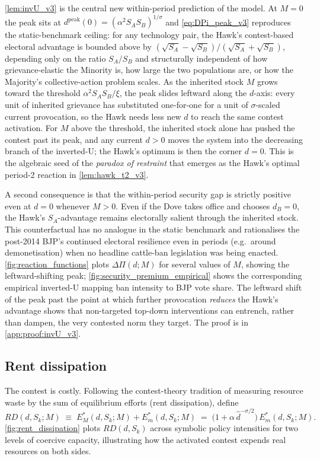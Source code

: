 \documentclass[11pt,twoside]{extarticle}
\begin{document}
\autoref{lem:invU_v3} is the central new within-period prediction of the model. At $M=0$ the peak sits at $d^{\mathrm{peak}}(0)=(\alpha^2 S_A S_B)^{1/\sigma}$ and \autoref{eq:DPi_peak_v3} reproduces the static-benchmark ceiling: for any technology pair, the Hawk's contest-based electoral advantage is bounded above by $(\sqrt{S_A}-\sqrt{S_B})/(\sqrt{S_A}+\sqrt{S_B})$, depending only on the ratio $S_A/S_B$ and structurally independent of how grievance-elastic the Minority is, how large the two populations are, or how the Majority's collective-action problem scales. As the inherited stock $M$ grows toward the threshold $\alpha^2 S_A S_B/\xi$, the peak slides leftward along the $d$-axis: every unit of inherited grievance has substituted one-for-one for a unit of $\sigma$-scaled current provocation, so the Hawk needs less new $d$ to reach the same contest activation. For $M$ above the threshold, the inherited stock alone has pushed the contest past its peak, and any current $d>0$ moves the system into the decreasing branch of the inverted-U; the Hawk's optimum is then the corner $d=0$. This is the algebraic seed of the \emph{paradox of restraint} that emerges as the Hawk's optimal period-2 reaction in \autoref{lem:hawk_t2_v3}.

A second consequence is that the within-period security gap is strictly positive even at $d=0$ whenever $M>0$. Even if the Dove takes office and chooses $d_B=0$, the Hawk's $S_A$-advantage remains electorally salient through the inherited stock. This counterfactual has no analogue in the static benchmark and rationalises the post-2014 BJP's continued electoral resilience even in periods (e.g.\ around demonetisation) when no headline cattle-ban legislation was being enacted. \autoref{fig:reaction_functions} plots $\Delta\Pi(d;M)$ for several values of $M$, showing the leftward-shifting peak; \autoref{fig:security_premium_empirical} shows the corresponding empirical inverted-U mapping ban intensity to BJP vote share. The leftward shift of the peak past the point at which further provocation \emph{reduces} the Hawk's advantage shows that non-targeted top-down interventions can entrench, rather than dampen, the very contested norm they target. The proof is in \autoref{app:proof:invU_v3}.

\subsection{Rent dissipation}\label{subsec:RD_v3}

The contest is costly. Following the contest-theory tradition of measuring resource waste by the sum of equilibrium efforts (rent dissipation), define
\begin{equation}\label{eq:RD_v3}
    RD(d,S_k;M)\;\equiv\;E_M^*(d,S_k;M)+E_m^*(d,S_k;M)\;=\;\big(1+\alpha\,\hat d^{-\sigma/2}\big)\,E_m^*(d,S_k;M).
\end{equation}
\autoref{fig:rent_dissipation} plots $RD(d,S_k)$ across symbolic policy intensities for two levels of coercive capacity, illustrating how the activated contest expends real resources on both sides.
\end{document}
